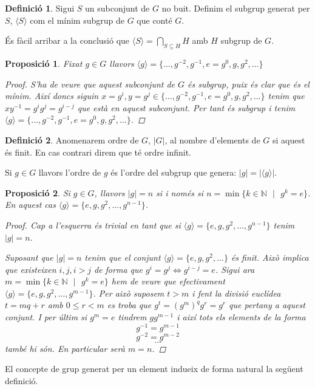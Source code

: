 \documentclass[a4paper,11pt]{report}
\newcommand{\inv}[1]{#1^{-1}}
\theoremstyle{theorem}
\newtheorem{proposicio}{\normalfont \sffamily\bfseries Proposició}[section]
\theoremstyle{definition}
\newtheorem{definicio}{\normalfont\sffamily\bfseries Definició}[section]
\begin{document}
\begin{definicio}
	Sigui $S$ un subconjunt de $G$ no buit. Definim el subgrup generat per $S$, $\langle S\rangle$ com el mínim subgrup de $G$ que conté $G$.
\end{definicio} 
És fàcil arribar a la conclusió que $\langle S\rangle=\bigcap_ {S\subseteq H} H$ amb $H$ subgrup de $G$.
\begin{proposicio}
	Fixat $g\in G$ llavors $\langle g\rangle=\{\ldots,g^{-2},\inv{g},e=g^0,g,g^2,\ldots\}$
	\begin{proof}
		S'ha de veure que aquest subconjunt de $G$ és subgrup, puix és clar que és el mínim. Així doncs siguin $x=g^i,y=g^j\in \{\ldots,g^{-2},\inv{g},e=g^0,g,g^2,\ldots\}$ tenim que $x\inv{y}=g^i g^{j}=g^{i-j}$ que està en aquest subconjunt. Per tant és subgrup i tenim $\langle g\rangle=\{\ldots,g^{-2},\inv{g},e=g^0,g,g^2,\ldots\}$.
	\end{proof}
	\end{proposicio}
\begin{definicio}
	Anomenarem ordre de $G$, $|G|$, al nombre d'elements de $G$ si aquest és finit. En cas contrari direm que té ordre infinit.
	
	Si $g\in G$ llavors l'ordre de $g$ és l'ordre del subgrup que genera: $|g|=|\langle g\rangle|$.
\end{definicio}
	\begin{proposicio}
		Si $g\in G$, llavors $|g|=n$ si i només si $n=\min\{k\in\mathbb{N} \text{ }|\text{ } g^k=e\}$. En aquest cas $\langle g\rangle=\{e,g,g^2,\ldots,g^{n-1}\}$.
		\begin{proof}
		Cap a l'esquerra és trivial en tant que si  $\langle g\rangle=\{e,g,g^2,\ldots,g^{n-1}\}$ tenim $|g|=n$.
		
	
		Suposant que $|g|=n$ tenim que el conjunt $\langle g\rangle=\{e,g,g^2,\ldots\}$ és finit. Això implica que existeixen $i,j,i>j$ de forma que $g^i=g^j\Leftrightarrow g^{i-j}=e$. Sigui ara $m=\min\{k\in\mathbb{N} \text{ }|\text{ } g^k=e\}$ hem de veure que efectivament $\langle g\rangle=\{e,g,g^2,\ldots,g^{m-1}\}$. Per això suposem $t>m$ i fent la divisió euclídea $t=mq+r$ amb $0\leq r<m$ es troba que $g^t=(g^m)^q g^r=g^r$ que pertany a aquest conjunt. I per últim si $g^m=e$ tindrem $gg^{m-1}$ i així tots els elements de la forma
		$$\inv{g}=g^{m-1}$$
		$$g^{-2}=g^{m-2}$$
		$$\dots$$
		també hi són. En particular serà $m=n$.
			\end{proof}
	\end{proposicio}
El concepte de grup generat per un element indueix de forma natural la següent definició.
\end{document}
